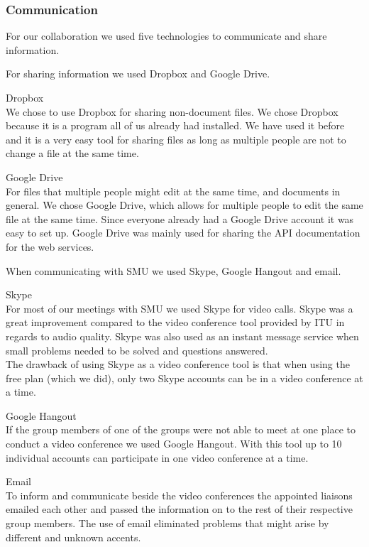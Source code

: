 \subsubsection{Communication}
For our collaboration we used five technologies to communicate and share information.

For sharing information we used Dropbox and Google Drive. \vspace{-4mm}
\begin{description}
	\item Dropbox \\
		We chose to use Dropbox for sharing non-document files. We chose Dropbox because it is a program all of us already had installed. We have used it before and it is a very easy tool for sharing files as long as multiple people are not to change a file at the same time.
	\item Google Drive \\
		For files that multiple people might edit at the same time, and documents in general. We chose Google Drive, which allows for multiple people to edit the same file at the same time. Since everyone already had a Google Drive account it was easy to set up.
		Google Drive was mainly used for sharing the API documentation for the web services.
\end{description}

When communicating with SMU we used Skype, Google Hangout and email.
\vspace{-4mm}
\begin{description}
	\item Skype \\
		For most of our meetings with SMU we used Skype for video calls. Skype was a great improvement compared to the video conference tool provided by ITU in regards to audio quality.
		Skype was also used as an instant message service when small problems needed to be solved and questions answered. \\
		The drawback of using Skype as a video conference tool is that when using the free plan (which we did), only two Skype accounts can be in a video conference at a time.
	\item Google Hangout \\
		If the group members of one of the groups were not able to meet at one place to conduct a video conference we used Google Hangout. With this tool up to 10 individual accounts can participate in one video conference at a time.
	\item Email \\
		To inform and communicate beside the video conferences the appointed liaisons emailed each other and passed the information on to the rest of their respective group members.
		The use of email eliminated problems that might arise by different and unknown accents.
\end{description}